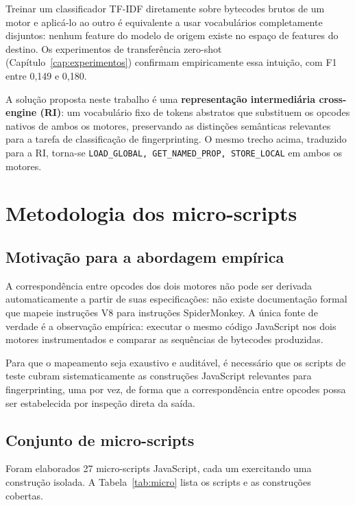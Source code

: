 Treinar um classificador TF-IDF diretamente sobre bytecodes brutos de um motor e
aplicá-lo ao outro é equivalente a usar vocabulários completamente disjuntos:
nenhum feature do modelo de origem existe no espaço de features do destino. Os
experimentos de transferência zero-shot (Capítulo~\ref{cap:experimentos}) confirmam
empiricamente essa intuição, com F1 entre 0,149 e 0,180.

A solução proposta neste trabalho é uma \textbf{representação intermediária
cross-engine (RI)}: um vocabulário fixo de tokens abstratos que substituem os
opcodes nativos de ambos os motores, preservando as distinções semânticas relevantes
para a tarefa de classificação de fingerprinting. O mesmo trecho acima,
traduzido para a RI, torna-se \texttt{LOAD\_GLOBAL, GET\_NAMED\_PROP, STORE\_LOCAL}
em ambos os motores.

\section{Metodologia dos micro-scripts}
\label{sec:micro}

\subsection{Motivação para a abordagem empírica}
\label{sub:micro-motivacao}

A correspondência entre opcodes dos dois motores não pode ser derivada
automaticamente a partir de suas especificações: não existe documentação formal que
mapeie instruções V8 para instruções SpiderMonkey. A única fonte de verdade é a
observação empírica: executar o mesmo código JavaScript nos dois motores
instrumentados e comparar as sequências de bytecodes produzidas.

Para que o mapeamento seja exaustivo e auditável, é necessário que os scripts de
teste cubram sistematicamente as construções JavaScript relevantes para
fingerprinting, uma por vez, de forma que a correspondência entre opcodes
possa ser estabelecida por inspeção direta da saída.

\subsection{Conjunto de micro-scripts}
\label{sub:micro-conjunto}

Foram elaborados 27 micro-scripts JavaScript, cada um
exercitando uma construção isolada. A Tabela~\ref{tab:micro} lista os scripts e as
construções cobertas.


